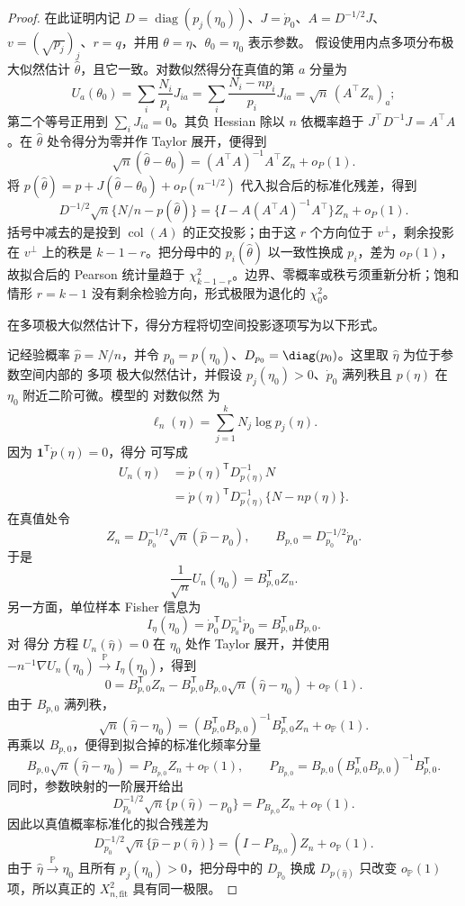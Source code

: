 \begin{proof}
在此证明内记 $D=\operatorname{diag}(p_j(\eta_0))$、$J=\dot p_0$、$A=D^{-1/2}J$、
$v=(\sqrt{p_j})_j$、$r=q$，并用 $\theta=\eta$、$\theta_0=\eta_0$ 表示参数。
假设使用内点多项分布极大似然估计 \(\widehat\theta\)，且它一致。对数似然得分在真值的第 \(a\) 分量为
\[
U_a(\theta_0)
=\sum_i\frac{N_i}{p_i}J_{ia}
=\sum_i\frac{N_i-np_i}{p_i}J_{ia}
=\sqrt n\,(A^\top Z_n)_a;
\]
第二个等号正用到 \(\sum_iJ_{ia}=0\)。其负 Hessian 除以 \(n\) 依概率趋于
\(J^\top D^{-1}J=A^\top A\)。在 \(\widehat\theta\) 处令得分为零并作 Taylor 展开，便得到
\[
\sqrt n(\widehat\theta-\theta_0)
=(A^\top A)^{-1}A^\top Z_n+o_P(1).
\]
将 \(p(\widehat\theta)=p+J(\widehat\theta-\theta_0)+o_P(n^{-1/2})\)
代入拟合后的标准化残差，得到
\[
D^{-1/2}\sqrt n\{N/n-p(\widehat\theta)\}
=\{I-A(A^\top A)^{-1}A^\top\}Z_n+o_P(1).
\]
括号中减去的是投到 \(\operatorname{col}(A)\) 的正交投影；由于这 \(r\) 个方向位于 \(v^\perp\)，剩余投影在 \(v^\perp\) 上的秩是 \(k-1-r\)。把分母中的 \(p_i(\widehat\theta)\) 以一致性换成 \(p_i\)，差为 \(o_P(1)\)，故拟合后的 Pearson 统计量趋于
\(\chi^2_{k-1-r}\)。边界、零概率或秩亏须重新分析；饱和情形 \(r=k-1\) 没有剩余检验方向，形式极限为退化的 \(\chi^2_0\)。

在多项极大似然估计下，得分方程将切空间投影逐项写为以下形式。

记经验概率 $\widehat p=N/n$，并令 $p_0=p(\eta_0)$、$D_{p_0}=\diag(p_0)$。这里取 $\widehat\eta$ 为位于参数空间内部的 多项 极大似然估计，并假设 $p_j(\eta_0)>0$、$\dot p_0$ 满列秩且 $p(\eta)$ 在 $\eta_0$ 附近二阶可微。模型的 对数似然 为
\[
 \ell_n(\eta)=\sum_{j=1}^kN_j\log p_j(\eta).
\]
因为 $\mathbf1^{\mathsf T}\dot p(\eta)=0$，得分 可写成
\begin{align*}
 U_n(\eta)
 &=\dot p(\eta)^{\mathsf T}
 D_{p(\eta)}^{-1}N\\
 &=\dot p(\eta)^{\mathsf T}
 D_{p(\eta)}^{-1}
 \{N-np(\eta)\}.
\end{align*}
在真值处令
\[
 Z_n=D_{p_0}^{-1/2}\sqrt n(\widehat p-p_0),
 \qquad
 B_{p,0}=D_{p_0}^{-1/2}\dot p_0.
\]
于是
\[
 \frac1{\sqrt n}U_n(\eta_0)
 =B_{p,0}^{\mathsf T}Z_n.
\]
另一方面，单位样本 Fisher 信息为
\[
 I_\eta(\eta_0)
 =\dot p_0^{\mathsf T}D_{p_0}^{-1}\dot p_0
 =B_{p,0}^{\mathsf T}B_{p,0}.
\]
对 得分 方程 $U_n(\widehat\eta)=0$ 在 $\eta_0$ 处作 Taylor 展开，并使用 $-n^{-1}\nabla U_n(\eta_0)\xrightarrow{\mathbb P} I_\eta(\eta_0)$，得到
\[
 0
 =B_{p,0}^{\mathsf T}Z_n
 -B_{p,0}^{\mathsf T}B_{p,0}
 \sqrt n(\widehat\eta-\eta_0)
 +o_{\mathbb P}(1).
\]
由于 $B_{p,0}$ 满列秩，
\[
 \sqrt n(\widehat\eta-\eta_0)
 =(B_{p,0}^{\mathsf T}B_{p,0})^{-1}B_{p,0}^{\mathsf T}Z_n
 +o_{\mathbb P}(1).
\]
再乘以 $B_{p,0}$，便得到拟合掉的标准化频率分量
\[
 B_{p,0}\sqrt n(\widehat\eta-\eta_0)
 =P_{B_{p,0}}Z_n+o_{\mathbb P}(1),
 \qquad
 P_{B_{p,0}}
 =B_{p,0}(B_{p,0}^{\mathsf T}B_{p,0})^{-1}B_{p,0}^{\mathsf T}.
\]
同时，参数映射的一阶展开给出
\[
 D_{p_0}^{-1/2}\sqrt n
 \{p(\widehat\eta)-p_0\}
 =P_{B_{p,0}}Z_n+o_{\mathbb P}(1).
\]
因此以真值概率标准化的拟合残差为
\[
 D_{p_0}^{-1/2}\sqrt n
 \{\widehat p-p(\widehat\eta)\}
 =(I-P_{B_{p,0}})Z_n+o_{\mathbb P}(1).
\]
由于 $\widehat\eta\xrightarrow{\mathbb P}\eta_0$ 且所有 $p_j(\eta_0)>0$，把分母中的 $D_{p_0}$ 换成 $D_{p(\widehat\eta)}$ 只改变 $o_{\mathbb P}(1)$ 项，所以真正的 $X_{n,\mathrm{fit}}^2$ 具有同一极限。


\end{proof}
